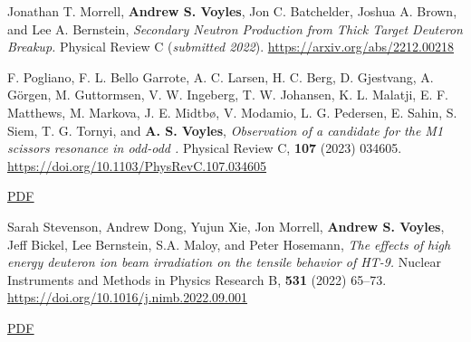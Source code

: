 \begin{bibsection}





\item Jonathan T. Morrell, \textbf{Andrew S. Voyles}, Jon C. Batchelder, Joshua A. Brown, and Lee A. Bernstein, \emph{Secondary Neutron Production from Thick Target Deuteron Breakup.} Physical Review C  (\emph{submitted 2022}). \url{https://arxiv.org/abs/2212.00218} 


\item F. Pogliano, F. L. Bello Garrote, A. C. Larsen, H. C. Berg, D. Gjestvang, A. Görgen, M. Guttormsen, V. W. Ingeberg, T. W. Johansen, K. L. Malatji, E. F. Matthews, M. Markova, J. E. Midtbø, V. Modamio, L. G. Pedersen, E. Sahin, S. Siem, T. G. Tornyi, and \textbf{A. S. Voyles}, \emph{Observation of a candidate for the M1 scissors resonance in odd-odd .} Physical Review C, \textbf{107} (2023) 034605. \url{https://doi.org/10.1103/PhysRevC.107.034605} 

\ifshort \vspace{0.1cm} \href{https://avoyles.github.io/papers/Pogliano2023_166Ho.pdf}{\underline{PDF}} \else  \fi 


\item Sarah Stevenson, Andrew Dong, Yujun Xie, Jon Morrell, \textbf{Andrew S. Voyles}, Jeff Bickel, Lee Bernstein, S.A. Maloy, and Peter Hosemann, \emph{The effects of high energy deuteron ion beam irradiation on the tensile behavior of HT-9.} Nuclear Instruments and Methods in Physics Research  B, \textbf{531} (2022) 65--73. \url{https://doi.org/10.1016/j.nimb.2022.09.001} 

\ifshort \vspace{0.1cm} \href{https://avoyles.github.io/papers/Stevenson2022_dogbones.pdf}{\underline{PDF}} \else  \fi 


\end{bibsection}
